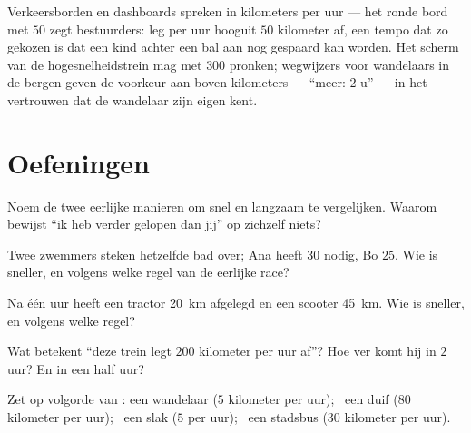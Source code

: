 \begin{example}\label{ex:g5:speed-distance-time:signs}
Verkeersborden en dashboards spreken in kilometers per uur --- het
ronde bord met $50$ zegt bestuurders: leg per uur hooguit $50$
kilometer af, een tempo dat zo gekozen is dat een kind achter een bal
aan nog gespaard kan worden. Het scherm van de hogesnelheidstrein mag
met $300$ pronken; wegwijzers voor wandelaars in de bergen geven de
voorkeur aan  boven kilometers --- ``meer: 2 u'' --- in het
vertrouwen dat de wandelaar zijn eigen  kent.
\end{example}

\section{Oefeningen}

\begin{exercise}[$\star$]\label{exo:g5:speed-distance-time:1}
Noem de twee eerlijke manieren om snel en langzaam te vergelijken.
Waarom bewijst ``ik heb verder gelopen dan jij'' op zichzelf niets?
\end{exercise}

\begin{exercise}[$\star$]\label{exo:g5:speed-distance-time:2}
Twee zwemmers steken hetzelfde bad over; Ana heeft $30$ 
nodig, Bo $25$. Wie is sneller, en volgens welke regel van de
eerlijke race?
\end{exercise}

\begin{exercise}[$\star$]\label{exo:g5:speed-distance-time:3}
Na één uur heeft een tractor \qty{20}{km} afgelegd en een scooter
\qty{45}{km}. Wie is sneller, en volgens welke regel?
\end{exercise}

\begin{exercise}[$\star$]\label{exo:g5:speed-distance-time:4}
Wat betekent ``deze trein legt $200$ kilometer per uur af''? Hoe ver
komt hij in $2$ uur? En in een half uur?
\end{exercise}

\begin{exercise}[$\star$]\label{exo:g5:speed-distance-time:5}
Zet op volgorde van : een wandelaar ($5$ kilometer per uur); \
een duif ($80$ kilometer per uur); \ een slak ($5$ \emph{} per
uur); \ een stadsbus ($30$ kilometer per uur).
\end{exercise}

